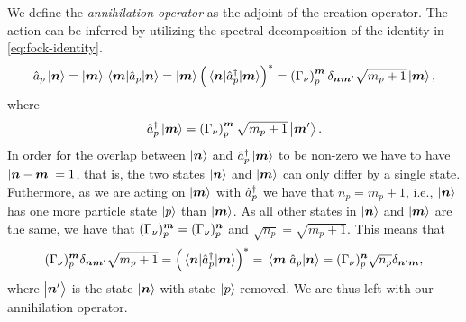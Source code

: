             We define the \emph{annihilation operator} as the adjoint of the
            creation operator.
            The action can be inferred by utilizing the spectral decomposition
            of the identity in \autoref{eq:fock-identity}.
            \begin{align}
                \hat{a}_{p}\ket{\boldsymbol{n}}
                = \ket{\boldsymbol{m}}\mel{\boldsymbol{m}}{\hat{a}_{p}}{\boldsymbol{n}}
                =
                \ket{\boldsymbol{m}}
                \left( 
                    \mel{\boldsymbol{n}}{\hat{a}_{p}^{\dagger}}{\boldsymbol{m}}
                 \right)^{*}
                = \left( \Gamma_{\nu} \right)^{\boldsymbol{m}}_{p}
                \delta_{\boldsymbol{n}\boldsymbol{m}'}
                \sqrt{m_p + 1}
                \ket{\boldsymbol{m}},
            \end{align}
            where
            \begin{align}
                \hat{a}_{p}^{\dagger}\ket{\boldsymbol{m}}
                = \left( \Gamma_{\nu} \right)^{\boldsymbol{m}}_{p}
                \sqrt{m_p + 1}
                \ket{\boldsymbol{m}'}.
            \end{align}
            In order for the overlap between $\ket{\boldsymbol{n}}$ and
            $\hat{a}_{p}^{\dagger}\ket{\boldsymbol{m}}$ to be non-zero we have to have $\abs{\boldsymbol{n}
            - \boldsymbol{m}} = 1$, that is, the two states $\ket{\boldsymbol{n}}$ and
            $\ket{\boldsymbol{m}}$ can only differ by a single state.
            Futhermore, as we are acting on $\ket{\boldsymbol{m}}$ with $\hat{a}_{p}^{\dagger}$ we
            have that $n_p = m_p + 1$, i.e., $\ket{\boldsymbol{n}}$ has one more
            particle state $\ket{p}$ than $\ket{\boldsymbol{m}}$.
            As all other states in $\ket{\boldsymbol{n}}$ and $\ket{\boldsymbol{m}}$ are the
            same, we have that $(\Gamma_{\nu})^{\boldsymbol{m}}_{p} =
            (\Gamma_{\nu})^{\boldsymbol{n}}_{p}$
            and $\sqrt{n_p} = \sqrt{m_p + 1}$.
            This means that
            \begin{align}
                (\Gamma_{\nu})^{\boldsymbol{m}}_{p}
                \delta_{\boldsymbol{n}\boldsymbol{m}'}
                \sqrt{m_p + 1}
                =
                \left( \mel{\boldsymbol{n}}{\hat{a}_{p}^{\dagger}}{\boldsymbol{m}} \right)^{*}
                =
                \mel{\boldsymbol{m}}{\hat{a}_{p}}{\boldsymbol{n}}
                =
                (\Gamma_{\nu})^{\boldsymbol{n}}_{p}
                \sqrt{n_p}
                \delta_{\boldsymbol{n}'\boldsymbol{m}},
            \end{align}
            where $\ket{\boldsymbol{n}'}$ is the state $\ket{\boldsymbol{n}}$ with state
            $\ket{p}$ removed.
            We are thus left with our annihilation operator.
